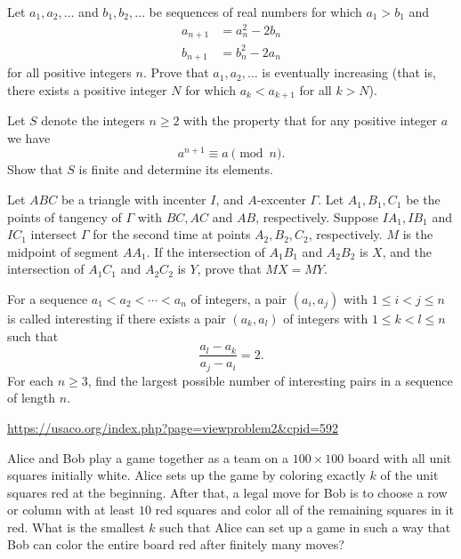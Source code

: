 \documentclass[11pt]{scrartcl}
\begin{document}
\begin{problem}
Let $a_1, a_2, \dots$ and $b_1, b_2, \dots$ be sequences of real numbers for which $a_1 > b_1$ and
\begin{align*}
    a_{n+1} &= a_n^2 - 2b_n\\
    b_{n+1} &= b_n^2 - 2a_n
\end{align*}for all positive integers $n$. Prove that $a_1, a_2, \dots$ is eventually increasing (that is, there exists a positive integer $N$ for which $a_k < a_{k+1}$ for all $k > N$).
\end{problem}
\begin{problem}
Let $S$ denote the integers $n\ge 2$ with the property that for any positive integer $a$ we have$$a^{n+1} \equiv a \pmod n.$$Show that $S$ is finite and determine its elements.
\end{problem}
\begin{problem}[PAGMO 2021/6]
   Let $ABC$ be a triangle with incenter $I$, and $A$-excenter $\Gamma$. Let $A_1,B_1,C_1$ be the points of tangency of $\Gamma$ with $BC,AC$ and $AB$, respectively. Suppose $IA_1, IB_1$ and $IC_1$ intersect $\Gamma$ for the second time at points $A_2,B_2,C_2$, respectively. $M$ is the midpoint of segment $AA_1$. If the intersection of $A_1B_1$ and $A_2B_2$ is $X$, and the intersection of $A_1C_1$ and $A_2C_2$ is $Y$, prove that $MX=MY$.
\end{problem}
\begin{problem}[EGMO 2024/4]
	For a sequence $a_1<a_2<\cdots<a_n$ of integers, a pair $(a_i,a_j)$ with $1\leq i<j\leq n$ is called interesting if there exists a pair $(a_k,a_l)$ of integers with $1\leq k<l\leq n$ such that$$\frac{a_l-a_k}{a_j-a_i}=2.$$For each $n\geq 3$, find the largest possible number of interesting pairs in a sequence of length $n$.
\end{problem}
\begin{problem}
\url{https://usaco.org/index.php?page=viewproblem2&cpid=592}
\end{problem}
\begin{problem}[JBMOSL 2021/C4]
Alice and Bob play a game together as a team on a $100 \times 100$ board with all unit squares initially white. Alice sets up the game by coloring exactly $k$ of the unit squares red at the beginning. After that, a legal move for Bob is to choose a row or column with at least $10$ red squares and color all of the remaining squares in it red. What is the
smallest $k$ such that Alice can set up a game in such a way that Bob can color the entire board red after finitely many moves?
\end{problem}
\end{document}
